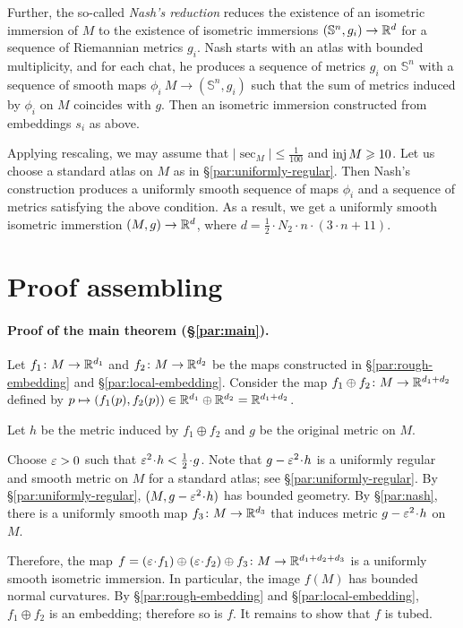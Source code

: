 \documentclass[a4paper,10pt]{article}
\begin{document}
Further, the so-called \emph{Nash's reduction} \cite[Part D]{nash} reduces the existence of an isometric immersion of $M$ to the existence of isometric immersions $(\mathbb{S}^n,g_i)\to \mathbb{R}^d$ for a sequence of Riemannian metrics $g_i$.
Nash starts with an atlas with bounded multiplicity, and for each chat, he produces a sequence of metrics $g_i$ on $\mathbb{S}^n$ with a sequence of smooth maps $\phi_i\:M\to (\mathbb{S}^n,g_i)$ 
such that the sum of metrics induced by $\phi_i$ on $M$ coincides with $g$.
Then an isometric immersion constructed from embeddings $s_i$ as above.

Applying rescaling, we may assume that $|\sec_M|\le \tfrac1{100}$ and $\operatorname{\rm inj} M\geqslant 10$.
Let us choose a standard atlas on $M$ as in §\ref{par:uniformly-regular}.
Then Nash's construction produces a uniformly smooth sequence of maps $\phi_i$ and a sequence of metrics satisfying the above condition.
As a result, we get a uniformly smooth isometric immerstion $(M,g)\to \mathbb{R}^d$, where $d= \tfrac12\cdot N_2\cdot n\cdot(3\cdot n+11)$.

\section*{Proof assembling}


\paragraph{Proof of the main theorem (§\ref{par:main}).}\label{par:main-proof}
Let $f_1\colon M\to\mathbb{R}^{d_1}$ and $f_2\colon M\to\mathbb{R}^{d_2}$ be the maps constructed in §\ref{par:rough-embedding} and §\ref{par:local-embedding}.
Consider the map $f_1\oplus f_2\colon M\to \mathbb{R}^{d_1+d_2}$ defined by $p\mapsto (f_1(p),f_2(p))\in \mathbb{R}^{d_1}\oplus\mathbb{R}^{d_2}=\mathbb{R}^{d_1+d_2}$.

Let $h$ be the metric induced by $f_1\oplus f_2$
and $g$ be the original metric on $M$.

Choose $\varepsilon>0$ such that $\eps^2\cdot h<\tfrac12\cdot g$.
Note that $g-\eps^2\cdot h$ is a uniformly regular and smooth metric on $M$ for a standard atlas; see §\ref{par:uniformly-regular}.
By §\ref{par:uniformly-regular}, $(M,g-\eps^2\cdot h)$ has bounded geometry.
By §\ref{par:nash}, there is a uniformly smooth map $f_3\colon M\to\mathbb{R}^{d_3}$ that induces metric $g-\eps^2\cdot h$ on $M$.

Therefore, the map $f=(\eps\cdot f_1)\oplus (\eps\cdot f_2)\oplus f_3\:M\to \RR^{d_1+d_2+d_3}$ is a uniformly smooth isometric immersion.
In particular, the image $f(M)$ has bounded normal curvatures.
By §\ref{par:rough-embedding} and §\ref{par:local-embedding}, $f_1\oplus f_2$ is an embedding;
therefore so is $f$.
It remains to show that $f$ is tubed.
\end{document}

